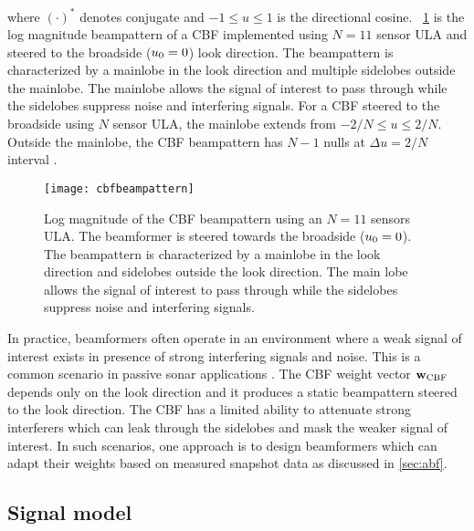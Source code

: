 where $(\cdot)^*$ denotes conjugate and $-1 \leq u \leq 1$ is the
directional cosine. \figurename{}~\ref{fig:cbf_bp} is the log
magnitude beampattern of a CBF implemented using $N = 11$ sensor ULA
and steered to the broadside ($u_0 = 0$) look direction. The
beampattern is characterized by a mainlobe in the look direction
and multiple sidelobes outside the mainlobe. The mainlobe allows the
signal of interest to pass through while the sidelobes suppress noise
and interfering signals. For a CBF steered to the broadside using $N$
sensor ULA, the mainlobe extends from $-2/N \leq u \leq 2/N$. Outside
the mainlobe, the CBF beampattern has $N - 1$ nulls at
$\Delta u = 2/N$ interval \cite{vtree2002oap}.

\begin{figure} \centering
    \texttt{[image: cbfbeampattern]}
    \caption[Log magnitude of the CBF beampattern using an $N=11$
      sensors ULA.]{Log magnitude of the CBF beampattern using an $N=11$
      sensors ULA. The beamformer is steered towards the broadside
      ($u_0=0$). The beampattern is characterized by a mainlobe in
      the look direction and sidelobes outside the look direction. The
      main lobe allows the signal of interest to pass through while
      the sidelobes suppress noise and interfering signals.}
    \label{fig:cbf_bp}
\end{figure}

In practice, beamformers often operate in an environment where a weak
signal of interest exists in presence of strong interfering signals
and noise. This is a common scenario in passive sonar applications
\cite{cox2002adaptive,baggeroer1999passive}. The CBF weight vector
${\bf w}_{\rm CBF}$ depends only on the look direction and it produces a static
beampattern steered to the look direction. The CBF has a limited
ability to attenuate strong interferers which can leak through the
sidelobes and mask the weaker signal of interest. In such scenarios,
one approach is to design beamformers which can adapt their weights
based on measured snapshot data as discussed in \sect{}\ref{sec:abf}.

\subsection{Signal model}
\label{sec:signal-model}


